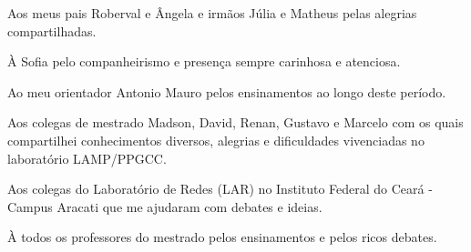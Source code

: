 \begin{agradecimentos}

  Aos meus pais Roberval e Ângela e irmãos Júlia e Matheus pelas alegrias compartilhadas.

  À Sofia pelo companheirismo e presença sempre carinhosa e atenciosa.

  Ao meu orientador Antonio Mauro pelos ensinamentos ao longo deste período. 

  Aos colegas de mestrado Madson, David, Renan, Gustavo e Marcelo com os quais compartilhei
  conhecimentos diversos, alegrias e dificuldades vivenciadas no laboratório LAMP/PPGCC.

  Aos colegas do Laboratório de Redes (LAR) no Instituto Federal do Ceará - Campus Aracati
  que me ajudaram com debates e ideias.

  À todos os professores do mestrado pelos ensinamentos e pelos ricos debates. 

\end{agradecimentos}
